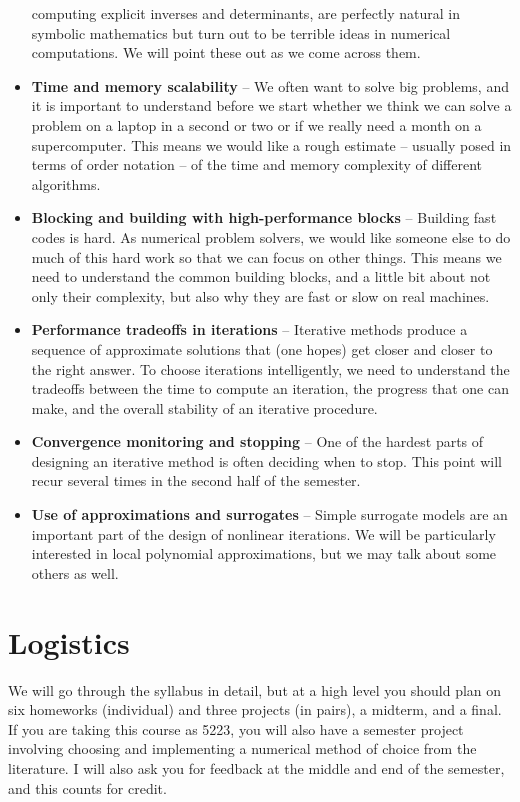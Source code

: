 \documentclass[12pt, leqno]{article}
\begin{document}
\begin{itemize}
  computing explicit inverses and determinants, are perfectly natural
  in symbolic mathematics but turn out to be terrible ideas in
  numerical computations.  We will point these out as we come across
  them.
\item {\bf Time and memory scalability} -- We often want to solve
  big problems, and it is important to understand before we start
  whether we think we can solve a problem on a laptop in a second or
  two or if we really need a month on a supercomputer.  This means
  we would like a rough estimate -- usually posed in terms of order notation
  -- of the time and memory complexity of different algorithms.
\item {\bf Blocking and building with high-performance blocks} --
  Building fast codes is hard.  As numerical problem solvers, we would
  like someone else to do much of this hard work so that we can focus
  on other things.  This means we need to understand the common
  building blocks, and a little bit about not only their complexity,
  but also why they are fast or slow on real machines.
\item {\bf Performance tradeoffs in iterations} -- Iterative methods
  produce a sequence of approximate solutions that (one hopes) get
  closer and closer to the right answer.  To choose iterations
  intelligently, we need to understand the tradeoffs between the
  time to compute an iteration, the progress that one can make, and
  the overall stability of an iterative procedure.
\item {\bf Convergence monitoring and stopping} -- One of the hardest
  parts of designing an iterative method is often deciding when to
  stop.  This point will recur several times in the second half of the
  semester.
\item {\bf Use of approximations and surrogates} -- Simple surrogate
  models are an important part of the design of nonlinear iterations.
  We will be particularly interested in local polynomial
  approximations, but we may talk about some others as well.
\end{itemize}

\section{Logistics}

We will go through the syllabus in detail, but at a high level you
should plan on six homeworks (individual) and three projects (in
pairs), a midterm, and a final.  If you are taking this course as
5223, you will also have a semester project involving choosing and
implementing a numerical method of choice from the literature.  I will
also ask you for feedback at the middle and end of the semester, and
this counts for credit.
\end{document}
